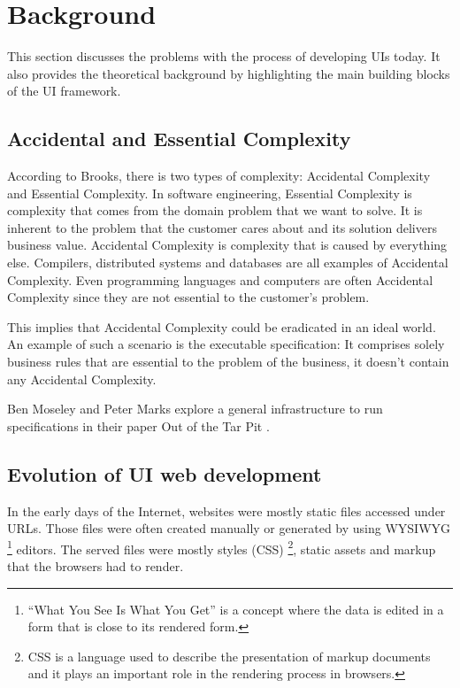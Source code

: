 \section{Background}\label{background}
This section discusses the problems with the process of developing UIs today. It also provides the theoretical background by highlighting the main building blocks of the UI framework.

\subsection{Accidental and Essential Complexity}
According to Brooks, there is two types of complexity: Accidental Complexity and Essential Complexity. \citep{nosilverbullet}
In software engineering, Essential Complexity is complexity that comes from the domain problem that we want to solve. It is inherent to the problem that the customer cares about and its solution delivers business value. Accidental Complexity is complexity that is caused by everything else. Compilers, distributed systems and databases are all examples of Accidental Complexity. Even programming languages and computers are often Accidental Complexity since they are not essential to the customer's problem.

This implies that Accidental Complexity could be eradicated in an ideal world. An example of such a scenario is the executable specification: It comprises solely business rules that are essential to the problem of the business, it doesn't contain any Accidental Complexity.

Ben Moseley and Peter Marks explore a general infrastructure to run specifications in their paper Out of the Tar Pit \citep{outoftarpit}.

\subsection{Evolution of UI web development}\label{history}
In the early days of the Internet, websites were mostly static files accessed under URLs. Those files were often created manually or generated by using WYSIWYG \footnote{``What You See Is What You Get'' is a concept where the data is edited in a form that is close to its rendered form.} editors. The served files were mostly styles (CSS) \footnote{CSS is a language used to describe the presentation of markup documents and it plays an important role in the rendering process in browsers.}, static assets and markup that the browsers had to render.

